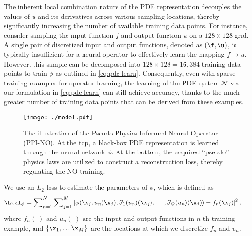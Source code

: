 The inherent local combination nature of the PDE representation decouples the values of $u$ and its derivatives across various sampling locations, thereby significantly increasing the number of available training data points. For instance, consider sampling the input function $f$ and output function $u$ on a $128 \times 128$ grid. A single pair of discretized input and output functions, denoted as $(\f, \u)$, is typically insufficient for a neural operator to effectively learn the mapping $f \rightarrow u$. However, this sample can be decomposed into $128 \times 128 = 16,384$ training data points to train $\phi$ as outlined in \eqref{eq:pde-learn}. Consequently, even with sparse training examples for operator learning, the learning of the PDE system $\mathcal{N}$ via our formulation in \eqref{eq:pde-learn} can still achieve accuracy, thanks to the much greater number of training data points that can be derived from these examples.

\begin{figure*}[t]
    \centering
    \setlength\tabcolsep{0pt}
    \texttt{[image: ./model.pdf]}
    \caption{\small The illustration of the Pseudo Physics-Informed Neural Operator (PPI-NO). At the top, a black-box PDE representation is learned through the neural network $\phi$. At the bottom, the acquired ``pseudo'' physics laws are utilized to construct a reconstruction loss, thereby regulating the NO training.
    } \label{fig:model}
\end{figure*}

We use an $L_2$ loss to estimate the parameters of $\phi$, which is defined as 
\begin{align}
	\Lcal_\phi =  \sum\nolimits_{n=1}^{N}\sum\nolimits_{j=1}^M &\left[\phi(\x_{j}, u_n(\x_{j}), S_1(u_n)(\x_{j}), \ldots, S_Q(u_n)(\x_{j})) - f_n(\x_{j})\right]^2, \label{eq:eq-loss}
\end{align}
where $f_n(\cdot)$ and $u_n(\cdot)$ are the input and output functions in $n$-th training example, and $\{\x_1, \ldots \x_M\}$ are the  locations at which we discretize $f_n$ and $u_n$. 

